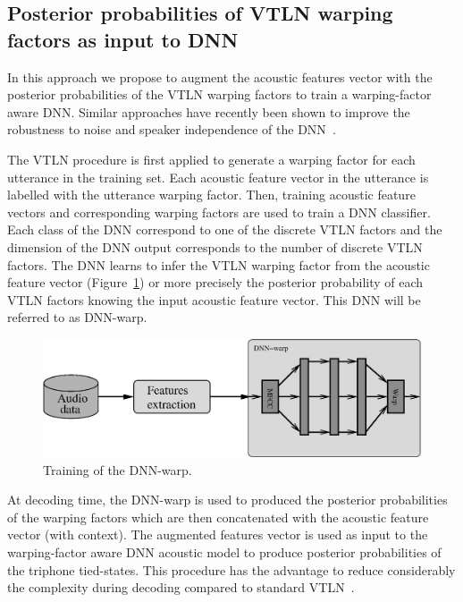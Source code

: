 \documentclass{nle}
\begin{document}
\subsection{Posterior probabilities of VTLN warping factors as input to DNN}
In this  approach we propose  to augment the acoustic  features vector
with the posterior probabilities of  the VTLN warping factors to train
a warping-factor  aware DNN.   Similar approaches have  recently been
shown  to  improve the  robustness  to noise and  speaker  independence of  the
DNN~\citep{export:194344,42536}.

The VTLN procedure is first applied to generate a warping factor for
each  utterance in the  training set. Each acoustic feature vector in the utterance is labelled with the utterance warping factor. Then, training acoustic feature vectors and corresponding warping factors are used to train a DNN classifier. Each class of the DNN correspond to one of the discrete VTLN factors and the dimension of the DNN output corresponds to the number of discrete VTLN factors. The DNN learns to infer the VTLN warping factor from the acoustic feature vector (Figure~\ref{fig1}) or more precisely the posterior probability of each VTLN factors knowing the input acoustic feature vector. This DNN will be referred to as DNN-warp.
\begin{figure}
       \includegraphics[width=\textwidth]{fig1}
        \caption{Training of the DNN-warp.} 
   	\label{fig1}
\end{figure}

%
%

At  decoding time,  the DNN-warp  is  used to  produced the  posterior probabilities of  the warping factors which are  then concatenated with the acoustic  feature vector  (with context).  The  augmented features vector is used as input to the warping-factor aware DNN acoustic model to produce  posterior probabilities of the  triphone tied-states. This procedure  has the  advantage  to reduce  considerably the  complexity during decoding compared to standard VTLN~\cite{LeeRos96}.
\end{document}
